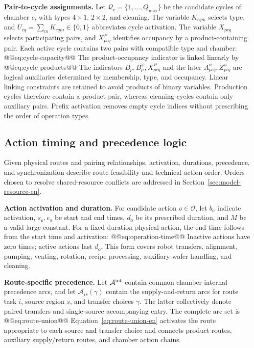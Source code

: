 \noindent\textbf{Pair-to-cycle assignments.}
Let $\mathcal Q_c=\{1,\ldots,Q_{\max}\}$ be the candidate cycles of chamber $c$, with types $4\times1$, $2\times2$, and cleaning. The variable $K_{cqm}$ selects type, and $U_{cq}=\sum_mK_{cqm}\in\{0,1\}$ abbreviates cycle activation. The variable $X_{pcq}$ selects participating pairs, and $X^P_{pcq}$ identifies occupancy by a product-containing pair. Each active cycle contains two pairs with compatible type and chamber:
@@eq:cycle-capacity@@
The product-occupancy indicator is linked linearly by
@@eq:cycle-products@@
The indicators $B_p,B_p^{\psi},X^P_{pcq}$ and the later $A^{\psi}_{pcq},Z^{\psi}_{pcq}$ are logical auxiliaries determined by membership, type, and occupancy. Linear linking constraints are retained to avoid products of binary variables. Production cycles therefore contain a product pair, whereas cleaning cycles contain only auxiliary pairs. Prefix activation removes empty cycle indices without prescribing the order of operation types.

\subsection{Action timing and precedence logic}
\label{sec:model-time-en}

Given physical routes and pairing relationships, activation, durations, precedence, and synchronization describe route feasibility and technical action order. Orders chosen to resolve shared-resource conflicts are addressed in Section~\ref{sec:model-resource-en}.

\noindent\textbf{Action activation and duration.}
For candidate action $o\in\mathcal O$, let $b_o$ indicate activation, $s_o,e_o$ be start and end times, $d_o$ be its prescribed duration, and $M$ be a valid large constant. For a fixed-duration physical action, the end time follows from the start time and activation:
@@eq:operation-time@@
Inactive actions have zero times; active actions last $d_o$. This form covers robot transfers, alignment, pumping, venting, rotation, recipe processing, auxiliary-wafer handling, and cleaning.

\noindent\textbf{Route-specific precedence.}
Let $\mathcal A^{\rm int}$ contain common chamber-internal precedence arcs, and let $\mathcal A_{is}(\gamma)$ contain the supply-and-return arcs for route task $i$, source region $s$, and transfer choices $\gamma$. The latter collectively denote paired transfers and single-source accompanying entry. The complete arc set is
@@eq:route-union@@
Equation~\eqref{eq:route-union-en} activates the route appropriate to each source and transfer choice and connects product routes, auxiliary supply/return routes, and chamber action chains.

